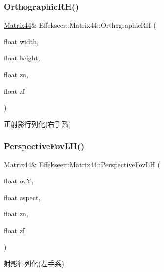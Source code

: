 \mbox{\label{struct_effekseer_1_1_matrix44_ac625feac179fd69f95a68d4382fa9e7a}} 
\subsubsection{\texorpdfstring{Orthographic\+R\+H()}{OrthographicRH()}}
{\footnotesize\ttfamily \mbox{\hyperlink{struct_effekseer_1_1_matrix44}{Matrix44}}\& Effekseer\+::\+Matrix44\+::\+Orthographic\+RH (\begin{DoxyParamCaption}\item[{float}]{width,  }\item[{float}]{height,  }\item[{float}]{zn,  }\item[{float}]{zf }\end{DoxyParamCaption})}



正射影行列化(右手系) 

\mbox{\label{struct_effekseer_1_1_matrix44_a01facdf54829125dfefa4b1f29210c74}} 
\subsubsection{\texorpdfstring{Perspective\+Fov\+L\+H()}{PerspectiveFovLH()}}
{\footnotesize\ttfamily \mbox{\hyperlink{struct_effekseer_1_1_matrix44}{Matrix44}}\& Effekseer\+::\+Matrix44\+::\+Perspective\+Fov\+LH (\begin{DoxyParamCaption}\item[{float}]{ovY,  }\item[{float}]{aspect,  }\item[{float}]{zn,  }\item[{float}]{zf }\end{DoxyParamCaption})}



射影行列化(左手系) 


